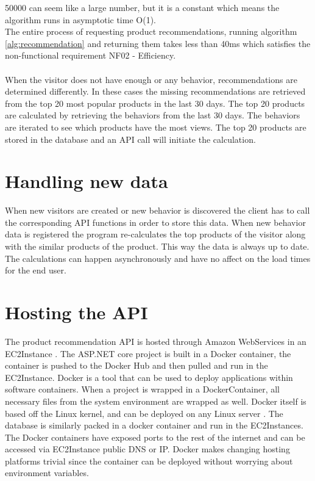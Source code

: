 50000 can seem like a large number, but it is a constant which means the algorithm runs in asymptotic time O(1). \\
The entire process of requesting product recommendations, running algorithm \ref{alg:recommendation} and returning them takes less than 40ms which satisfies the non-functional requirement NF02 - Efficiency. \\\\
When the visitor does not have enough or any behavior, recommendations are determined differently. In these cases the missing recommendations are retrieved from the top 20 most popular products in the last 30 days. The top 20 products are calculated by retrieving the behaviors from the last 30 days. The behaviors are iterated to see which products have the most views. The top 20 products are stored in the database and an API call will initiate the calculation.

\section{Handling new data}
When new visitors are created or new behavior is discovered the client has to call the corresponding API functions in order to store this data. When new behavior data is registered the program re-calculates the top products of the visitor along with the similar products of the product. This way the data is always up to date. The calculations can happen asynchronously and have no affect on the load times for the end user.

\section{Hosting the API}
The product recommendation API is hosted through Amazon WebServices in an \gls{EC2Instance} \cite{EC2}. The ASP.NET core project is built in a Docker container, the container is pushed to the Docker Hub and then pulled and run in the \gls{EC2Instance}. Docker is a tool that can be used to deploy applications within software containers. When a project is wrapped in a \gls{DockerContainer}, all necessary files from the system environment are wrapped as well. Docker itself is based off the Linux kernel, and can be deployed on any Linux server \cite{Docker}.  The database is similarly packed in a docker container and run in the \glspl{EC2Instance}. The Docker containers have exposed ports to the rest of the internet and can be accessed via \gls{EC2Instance} public DNS or IP.  Docker makes changing hosting platforms trivial since the container can be deployed without worrying about environment variables.



			


 